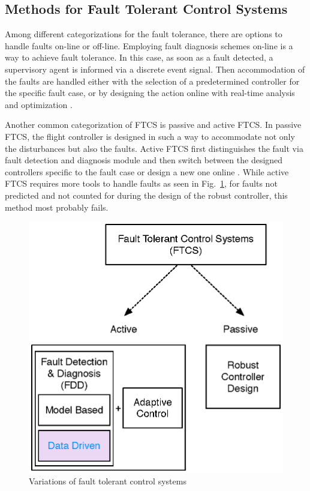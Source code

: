 \subsection{Methods for Fault Tolerant Control Systems}\label{ch1:methodsFTCS}

Among different categorizations for the fault tolerance, there are options to handle 
faults on-line or off-line. Employing fault diagnosis schemes on-line is a way to 
achieve fault tolerance. In this case, as soon as a fault detected, a supervisory 
agent is informed via a discrete event signal. Then accommodation of the faults 
are handled either with the selection of a predetermined controller for the specific 
fault case, or by designing the action online with real-time analysis and optimization \cite{blanke2000fault}.

Another common categorization of FTCS is passive and active FTCS. In passive FTCS, 
the flight controller is designed in such a way to accommodate not only the 
disturbances but also the faults. Active FTCS first distinguishes the fault via fault detection 
and diagnosis module and then switch between the designed controllers specific to the 
fault case or design a new one online \cite{angelov2012sense}. While active FTCS 
requires more tools to handle faults as seen in Fig.~\ref{fig:FTCS}, for faults 
not predicted and not counted for during the design of the robust controller, this method 
most probably fails. 

\begin{figure}
\begin{center}
\includegraphics[width=11.3cm]{figures/FTCS}
\caption{Variations of fault tolerant control systems } 
\label{fig:FTCS}
\end{center}
\end{figure}


